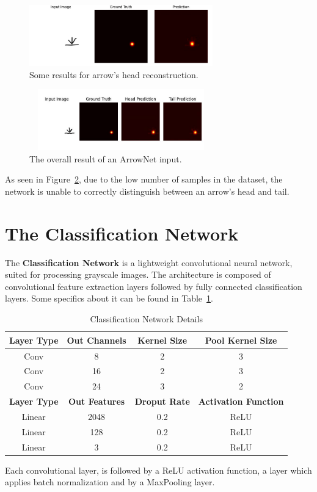 \documentclass[conference]{IEEEtran}
\begin{document}
\begin{appendices}
\begin{figure}[H]
	\centering
	\includegraphics[width=225pt, height=75pt]{arrownet1.jpg}
	\caption{Some results for arrow's head reconstruction.}
	\label{fig:arrownet1}
\end{figure}

\begin{figure}[H]
	\centering
	\includegraphics[width=225pt, height=75pt]{arrownet2.jpg}
	\caption{The overall result of an ArrowNet input.}
	\label{fig:arrownet2}
\end{figure}

As seen in Figure~\ref{fig:arrownet2}, due to the low number of samples in the dataset, the network is unable to correctly distinguish between an arrow's head and tail.

\section{The Classification Network}
\label{classification_net}

The \textbf{Classification Network} is a lightweight convolutional neural network, suited for processing grayscale images. The architecture is composed of convolutional feature extraction layers followed by fully connected classification layers. Some specifics about it can be found in Table~\ref{tab:classification-architecture}.

\begin{table}[h]
	\centering
	\caption{Classification Network Details}
	\label{tab:classification-architecture}
	\begin{tabular}{|c|c|c|c|}
		\hline
		\textbf{Layer Type} & \textbf{Out Channels} & \textbf{Kernel Size} & \textbf{Pool Kernel Size} \\
		\hline 
		Conv & 8 & 2 & 3 \\
		Conv & 16 & 2  & 3 \\
		Conv & 24 & 3  & 2 \\
		\hline
		\textbf{Layer Type} & \textbf{Out Features} & \textbf{Droput Rate} & \textbf{Activation Function} \\
		\hline 
		Linear & 2048 & 0.2 & ReLU \\
		Linear & 128 & 0.2 & ReLU \\
		Linear & 3 & 0.2 & ReLU \\
		\hline
	\end{tabular}
\end{table}

Each convolutional layer, is followed by a ReLU activation function, a layer which applies batch normalization and by a MaxPooling layer.

\end{appendices}
\end{document}
